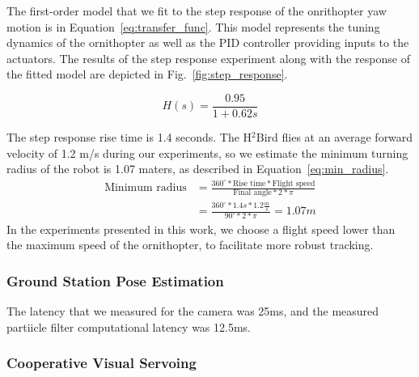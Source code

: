 \documentclass{aamas2013}
\begin{document}
The first-order model that we fit to the
step response of the onrithopter yaw motion is in Equation~\ref{eq:transfer_func}. This model represents the tuning dynamics of the ornithopter as well as the PID controller providing inputs to the actuators.
The results of the step response experiment along with the response of the fitted model are depicted in
Fig.~\ref{fig:step_response}.

\begin{equation}
\label{eq:transfer_func}
H(s) = \frac{0.95}{1+0.62s}
\end{equation}

The step response rise time is 1.4 seconds. The H$^2$Bird flies
at an average forward velocity of 1.2 m/s during our experiments, so we
estimate the minimum turning radius of the robot is 1.07 maters, as described in
Equation~\ref{eq:min_radius}.
\begin{equation}
\label{eq:min_radius}
\begin{aligned}
\text{Minimum radius} & = \frac{360^{\circ}*\text{Rise time}*\text{Flight
speed}}{\text{Final angle}*2*\pi}\\
& = \frac{360^{\circ}*1.4s*1.2\frac{m}{s}}{90^{\circ}*2*\pi} = 1.07 m
\end{aligned}
\end{equation}
In the experiments presented in this work, we choose a flight speed
lower than the maximum speed of the ornithopter, to facilitate more robust
tracking.

\subsubsection{Ground Station Pose Estimation}

The latency that we measured for the camera was 25ms, and the measured
partiicle filter computational latency was 12.5ms.

\subsubsection{Cooperative Visual Servoing}
\label{sec:visual_servoing}
\end{document}
